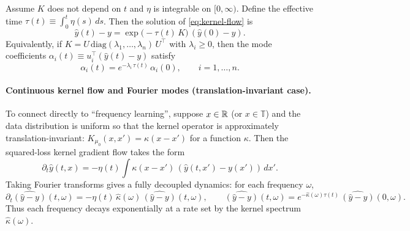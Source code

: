\begin{lemma}\label{lem:kernel-flow-solution}
\provedflag
Assume $K$ does not depend on $t$ and $\eta$ is integrable on $[0,\infty)$.
Define the effective time $\tau(t)\equiv \int_0^t \eta(s)\,ds$.
Then the solution of \eqref{eq:kernel-flow} is
\begin{equation}\label{eq:kernel-solution}
\hat y(t)-y=\exp\!\big(-\tau(t)\,K\big)\,(\hat y(0)-y).
\end{equation}
Equivalently, if $K=U\,\mathrm{diag}(\lambda_1,\dots,\lambda_n)\,U^\top$ with $\lambda_i\ge 0$, then the mode coefficients $\alpha_i(t)\equiv u_i^\top(\hat y(t)-y)$ satisfy
\begin{equation}\label{eq:mode-solution}
\alpha_i(t)=e^{-\lambda_i\,\tau(t)}\,\alpha_i(0),\qquad i=1,\dots,n.
\end{equation}
\end{lemma}

\paragraph{Continuous kernel flow and Fourier modes (translation-invariant case).}
To connect directly to ``frequency learning'', suppose $x\in\mathbb{R}$ (or $x\in\mathbb{T}$) and the data distribution is uniform so that the kernel operator is approximately translation-invariant:
$K_{\mu_0}(x,x')=\kappa(x-x')$ for a function $\kappa$.
Then the squared-loss kernel gradient flow takes the form
\begin{equation}\label{eq:kernel-flow-continuous}
\partial_t \hat y(t,x)=-\eta(t)\int \kappa(x-x')\,(\hat y(t,x')-y(x'))\,dx'.
\end{equation}
Taking Fourier transforms gives a fully decoupled dynamics:
for each frequency $\omega$,
\begin{equation}\label{eq:fourier-flow}
\partial_t \widehat{(\hat y-y)}(t,\omega)=-\eta(t)\,\widehat{\kappa}(\omega)\,\widehat{(\hat y-y)}(t,\omega),
\qquad
\widehat{(\hat y-y)}(t,\omega)=e^{-\widehat{\kappa}(\omega)\tau(t)}\,\widehat{(\hat y-y)}(0,\omega).
\end{equation}
Thus each frequency decays exponentially at a rate set by the kernel spectrum $\widehat{\kappa}(\omega)$.

